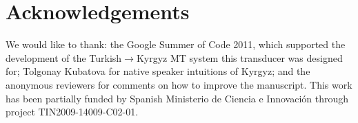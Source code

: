 \documentclass[10pt,a4paper,twocolumn]{article}
\begin{document}
\section*{Acknowledgements}

We would like to thank: the Google Summer of Code 2011, which supported the development of the Turkish$\rightarrow$Kyrgyz MT system this transducer was designed for; Tolgonay Kubatova for native speaker intuitions of Kyrgyz; and the anonymous reviewers for comments on how to improve the manuscript.  This work has been partially funded by Spanish Ministerio de Ciencia e Innovación through project TIN2009-14009-C02-01.





\end{document}
